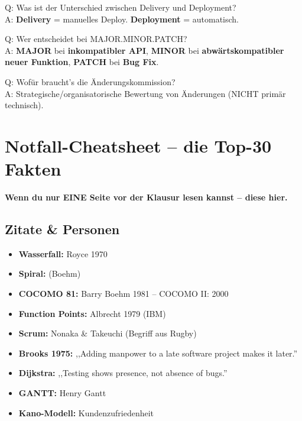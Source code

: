 \documentclass[11pt,a4paper]{article}
\begin{document}
\begin{quickcheck}
Q: Was ist der Unterschied zwischen Delivery und Deployment?\\
A: \textbf{Delivery} = manuelles Deploy. \textbf{Deployment} = automatisch.

Q: Wer entscheidet bei MAJOR.MINOR.PATCH?\\
A: \textbf{MAJOR} bei \textbf{inkompatibler API}, \textbf{MINOR} bei \textbf{abwärtskompatibler neuer Funktion}, \textbf{PATCH} bei \textbf{Bug Fix}.

Q: Wofür braucht's die Änderungskommission?\\
A: Strategische/organisatorische Bewertung von Änderungen (NICHT primär technisch).
\end{quickcheck}

\newpage
\section{Notfall-Cheatsheet -- die Top-30 Fakten}

\begin{tldr}
\textbf{Wenn du nur EINE Seite vor der Klausur lesen kannst -- diese hier.}
\end{tldr}

\subsection{Zitate \& Personen}

\begin{keyfacts}
\begin{itemize}
  \item \textbf{Wasserfall:} Royce 1970
  \item \textbf{Spiral:} (Boehm)
  \item \textbf{COCOMO 81:} Barry Boehm 1981 -- COCOMO II: 2000
  \item \textbf{Function Points:} Albrecht 1979 (IBM)
  \item \textbf{Scrum:} Nonaka \& Takeuchi (Begriff aus Rugby)
  \item \textbf{Brooks 1975:} ,,Adding manpower to a late software project makes it later.''
  \item \textbf{Dijkstra:} ,,Testing shows presence, not absence of bugs.''
  \item \textbf{GANTT:} Henry Gantt
  \item \textbf{Kano-Modell:} Kundenzufriedenheit
\end{itemize}
\end{keyfacts}
\end{document}
